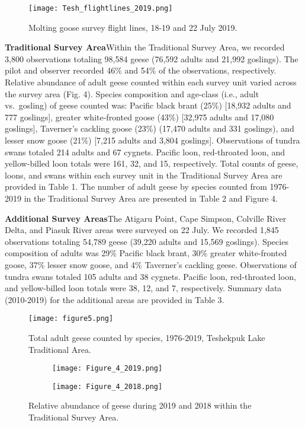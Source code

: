\documentclass[
]{article}
\begin{document}
\begin{figure}[H]
\texttt{[image: Tesh\_flightlines\_2019.png]}
\centering
\caption{Molting goose survey flight lines, 18-19 and 22 July 2019.}
\end{figure}

\textbf{Traditional Survey Area}\newline Within the Traditional Survey
Area, we recorded 3,800 observations totaling 98,584 geese (76,592
adults and 21,992 goslings). The pilot and observer recorded 46\% and
54\% of the observations, respectively. Relative abundance of adult
geese counted within each survey unit varied across the survey area
(Fig. 4). Species composition and age-class (i.e., adult vs.~gosling) of
geese counted was: Pacific black brant (25\%) {[}18,932 adults and 777
goslings{]}, greater white-fronted goose (43\%) {[}32,975 adults and
17,080 goslings{]}, Taverner's cackling goose (23\%) (17,470 adults and
331 goslings), and lesser snow goose (21\%) {[}7,215 adults and 3,804
goslings{]}. Observations of tundra swans totaled 214 adults and 67
cygnets. Pacific loon, red-throated loon, and yellow-billed loon totals
were 161, 32, and 15, respectively. Total counts of geese, loons, and
swans within each survey unit in the Traditional Survey Area are
provided in Table 1. The number of adult geese by species counted from
1976-2019 in the Traditional Survey Area are presented in Table 2 and
Figure 4.

\textbf{Additional Survey Areas}\newline The Atigaru Point, Cape
Simpson, Colville River Delta, and Piasuk River areas were surveyed on
22 July. We recorded 1,845 observations totaling 54,789 geese (39,220
adults and 15,569 goslings). Species composition of adults was 29\%
Pacific black brant, 30\% greater white-fronted goose, 37\% lesser snow
goose, and 4\% Taverner's cackling geese. Observations of tundra swans
totaled 105 adults and 38 cygnets. Pacific loon, red-throated loon, and
yellow-billed loon totals were 38, 12, and 7, respectively. Summary data
(2010-2019) for the additional areas are provided in Table 3.

\begin{figure}
\centering
\texttt{[image: figure5.png]}
\caption{Total adult geese counted by species,
1976-2019, Teshekpuk Lake Traditional Area.} 
\end{figure}

\begin{figure}[H]
\centering
\begin{subfigure}[ht]{0.85\textwidth}
\texttt{[image: Figure\_4\_2019.png]}
\end{subfigure}
\begin{subfigure}[ht]{0.85\textwidth}
\texttt{[image: Figure\_4\_2018.png]}
\end{subfigure}
\caption{Relative abundance of geese during 2019 and 2018 within the Traditional Survey Area.}
\end{figure}
\end{document}
